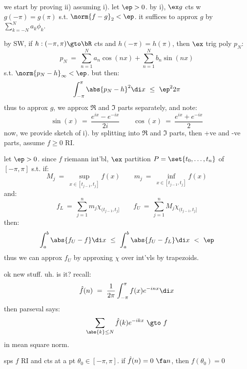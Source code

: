\begin{pf}
	we start by proving ii) assuming i).
	let $\ep>0$. by i), $\ex g$ cts w $g(-\pi)=g(\pi)$ s.t. $\norm{f-g}_{2}<\ep$.
	it suffices to approx $g$ by $\sum_{k=-N}^{N}a_{k}\phi_{k}$.

	by SW, if $h:(-\pi,\pi)\gto\bR$ cts and $h(-\pi)=h(\pi)$, then
	$\ex$ trig poly $p_{N}$:
	\begin{equation*}
		p_{N} \ = \ \sum_{n=1}^{N}a_{n}\cos(nx) + \sum_{n=1}^{N}b_{n}\sin(nx)
	\end{equation*}
	s.t. $\norm{p_{N}-h}_{\infty}<\ep$.
	but then:
	\begin{equation*}
		\int_{-\pi}^{\pi}\abs{p_{N}-h}^{2}\di x \ \leq \ \ep^{2}2\pi
	\end{equation*}
	thus to approx $g$, we approx $\Re$ and $\Im$ parts separately, and note:
	\begin{equation*}
		\sin(x) \ = \ \frac{e^{ix}-e^{-ix}}{2i} \qquad
		\cos(x) \ = \ \frac{e^{ix}+e^{-ix}}{2}
	\end{equation*}
	now, we provide sketch of i).
	by splitting into $\Re$ and $\Im$ parts, then +ve and -ve parts,
	assume $f\geq0$ RI.

	let $\ep>0$.
	since $f$ riemann int'bl, $\ex$ partition $P=\set{t_{0},\dots,t_{n}}$ of $[-\pi,\pi]$ s.t. if:
	\begin{equation*}
		M_{j} \ = \ \sup_{x\in[t_{j-1},t_{j}]}f(x) \qquad
		m_{j} \ = \ \inf_{x\in[t_{j-1},t_{j}]}f(x)
	\end{equation*}
	and:
	\begin{equation*}
		f_{L} \ = \ \sum_{j=1}^{n}m_{j}\chi_{(t_{j-1},t_{j}]} \qquad
		f_{U} \ = \ \sum_{j=1}^{n}M_{j}\chi_{(t_{j-1},t_{j}]}
	\end{equation*}
	then:
	\begin{equation*}
		\int_{a}^{b}\abs{f_{U}-f}\di x \ \leq \ \int_{a}^{b}\abs{f_{U}-f_{L}}\di x \ < \ \ep
	\end{equation*}
	thus we can approx $f_{U}$ by approxing $\chi$ over int'vls by trapezoids.
\end{pf}
ok new stuff. uh. is it? recall:
\begin{equation*}
	\hat{f}(n) \ = \ \frac{1}{2\pi}\int_{-\pi}^{\pi}f(x)e^{-inx}\di x
\end{equation*}
then parseval says:
\begin{equation*}
	\sum_{\abs{k}\leq N}\hat{f}(k)e^{-ikx} \ \gto \ f
\end{equation*}
in mean square norm.

\begin{thm}
	sps $f$ RI and cts at a pt $\theta_{0}\in[-\pi,\pi]$.
	if $\hat{f}(n)=0 \ \fa n$, then $f(\theta_{0})=0$
\end{thm} \

